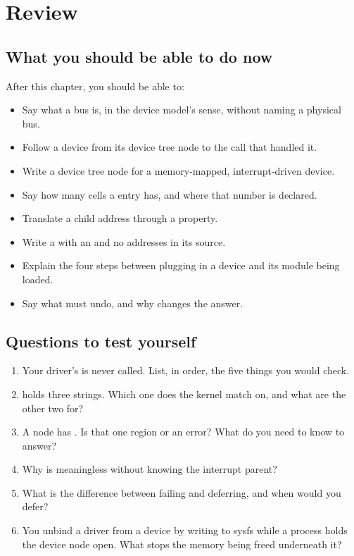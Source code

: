 
\section{Review}
\label{c10:sec:review}

\subsection*{What you should be able to do now}
After this chapter, you should be able to:
\begin{itemize}
  \item Say what a bus is, in the device model's sense, without naming a physical bus.
  \item Follow a device from its device tree node to the  call that handled it.
  \item Write a device tree node for a memory-mapped, interrupt-driven device.
  \item Say how many cells a  entry has, and where that number is declared.
  \item Translate a child address through a  property.
  \item Write a  with an  and no addresses in its source.
  \item Explain the four steps between plugging in a device and its module being loaded.
  \item Say what  must undo, and why  changes the answer.
\end{itemize}

\subsection*{Questions to test yourself}
\begin{enumerate}
  \item Your driver's  is never called. List, in order, the five things you would check.
  \item {} holds three strings. Which one does the kernel match on, and what are the
    other two for?
  \item A node has . Is that one region or an error? What do you need to
    know to answer?
  \item Why is  meaningless without knowing the interrupt parent?
  \item What is the difference between  failing and  deferring, and when
    would you defer?
  \item You unbind a driver from a device by writing to sysfs while a process holds the device node
    open. What stops the memory being freed underneath it?
\end{enumerate}

